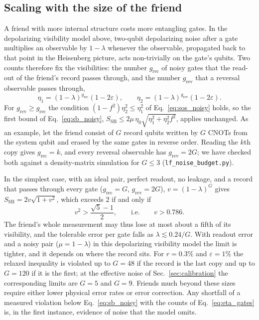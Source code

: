 \subsection{Scaling with the size of the friend}
\label{sec:friend_size}

A friend with more internal structure costs more entangling gates. In the depolarizing visibility model above, two-qubit depolarizing noise after a gate multiplies an observable by $1 - \lambda$ whenever the observable, propagated back to that point in the Heisenberg picture, acts non-trivially on the gate's qubits. Two counts therefore fix the visibilities: the number $g_{\mathrm{rec}}$ of noisy gates that the read-out of the friend's record passes through, and the number $g_{\mathrm{rev}}$ that a reversal observable passes through,
\begin{equation}
    \eta_1 = (1-\lambda)^{g_{\mathrm{rec}}}(1 - 2\varepsilon), \qquad
    \eta_2 = (1-\lambda)^{g_{\mathrm{rev}}}(1 - 2\varepsilon).
    \label{eq:eta_gates}
\end{equation}
For $g_{\mathrm{rev}} \ge g_{\mathrm{rec}}$ the condition $(1 - f^2)\eta_2^2 \le \eta_1^2$ of Eq.~\eqref{eq:sos_noisy} holds, so the first bound of Eq.~\eqref{eq:sb_noisy}, $S_{\mathrm{SB}} \le 2\mu\,\eta_0\sqrt{\eta_1^2 + \eta_2^2 f^2}$, applies unchanged. As an example, let the friend consist of $G$ record qubits written by $G$ CNOTs from the system qubit and erased by the same gates in reverse order. Reading the $k$th copy gives $g_{\mathrm{rec}} = k$, and every reversal observable has $g_{\mathrm{rev}} = 2G$; we have checked both against a density-matrix simulation for $G \le 3$ (\texttt{lf\_noise\_budget.py}).

In the simplest case, with an ideal pair, perfect readout, no leakage, and a record that passes through every gate ($g_{\mathrm{rec}} = G$, $g_{\mathrm{rev}} = 2G$), $v = (1-\lambda)^G$ gives $S_{\mathrm{SB}} = 2v\sqrt{1 + v^2}$, which exceeds $2$ if and only if
\begin{equation}
    v^2 > \frac{\sqrt{5} - 1}{2}, \qquad\text{i.e.}\qquad v > 0.786 .
    \label{eq:golden_threshold}
\end{equation}
The friend's whole measurement may thus lose at most about a fifth of its visibility, and the tolerable error per gate falls as $\lambda \lesssim 0.24/G$. With readout error and a noisy pair ($\mu = 1 - \lambda$) in this depolarizing visibility model the limit is tighter, and it depends on where the record sits. For $r = 0.3\%$ and $\varepsilon = 1\%$ the relaxed inequality is violated up to $G = 48$ if the record is the last copy and up to $G = 120$ if it is the first; at the effective noise of Sec.~\ref{sec:calibration} the corresponding limits are $G = 5$ and $G = 9$. Friends much beyond these sizes require either lower physical error rates or error correction. Any shortfall of a measured violation below Eq.~\eqref{eq:sb_noisy} with the counts of Eq.~\eqref{eq:eta_gates} is, in the first instance, evidence of noise that the model omits.

